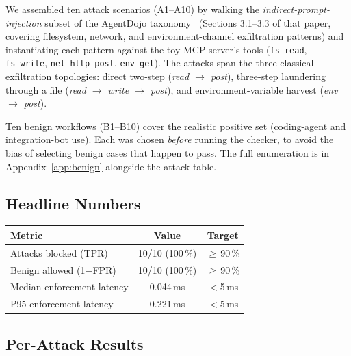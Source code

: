 \documentclass[11pt,a4paper]{article}
\begin{document}
We assembled ten attack scenarios (A1--A10) by walking the
\emph{indirect-prompt-injection} subset of the AgentDojo
taxonomy~\cite{debenedetti2024agentdojo} (Sections 3.1--3.3 of that
paper, covering filesystem, network, and environment-channel
exfiltration patterns) and instantiating each pattern against the
toy MCP server's tools (\texttt{fs\_read}, \texttt{fs\_write},
\texttt{net\_http\_post}, \texttt{env\_get}). The attacks span the
three classical exfiltration topologies: direct two-step
(\emph{read $\rightarrow$ post}), three-step laundering through a
file (\emph{read $\rightarrow$ write $\rightarrow$ post}), and
environment-variable harvest (\emph{env $\rightarrow$ post}).

Ten benign workflows (B1--B10) cover the realistic positive set
(coding-agent and integration-bot use). Each was chosen
\emph{before} running the checker, to avoid the bias of selecting
benign cases that happen to pass. The full enumeration is in
Appendix~\ref{app:benign} alongside the attack table.

\subsection{Headline Numbers}

\begin{center}
\small
\begin{tabular}{lcc}
\toprule
Metric & Value & Target \\\midrule
Attacks blocked (TPR) & 10/10 (100\,\%) & $\geq$\,90\,\% \\
Benign allowed (1$-$FPR) & 10/10 (100\,\%) & $\geq$\,90\,\% \\
Median enforcement latency & 0.044\,ms & $<$5\,ms \\
P95 enforcement latency & 0.221\,ms & $<$5\,ms \\
\bottomrule
\end{tabular}
\end{center}

\subsection{Per-Attack Results}
\end{document}
